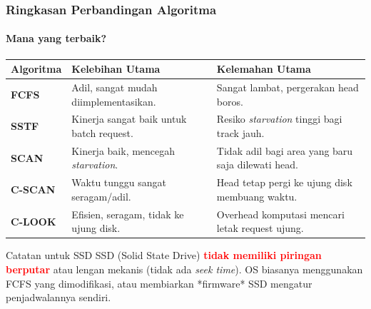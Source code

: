 \documentclass[t,aspectratio=169,xcolor=dvipsnames]{beamer}
\newcommand{\tem}[1]{\textbf{\textcolor{red}{#1}}}
\begin{document}
\begin{frame}
    \frametitle{Ringkasan Perbandingan Algoritma}
    \framesubtitle{Mana yang terbaik?}
    \small
    \begin{table}[]
        \centering
        \scriptsize
        \begin{tabular}{p{} p{} p{}}
            \toprule
            \textbf{Algoritma} & \textbf{Kelebihan Utama} & \textbf{Kelemahan Utama} \\
            \midrule
            \rowcolor{gray!10}
            \textbf{FCFS} & Adil, sangat mudah diimplementasikan. & Sangat lambat, pergerakan head boros. \\
            \textbf{SSTF} & Kinerja sangat baik untuk batch request. & Resiko \textit{starvation} tinggi bagi track jauh. \\
            \rowcolor{gray!10}
            \textbf{SCAN} & Kinerja baik, mencegah \textit{starvation}. & Tidak adil bagi area yang baru saja dilewati head. \\
            \textbf{C-SCAN} & Waktu tunggu sangat seragam/adil. & Head tetap pergi ke ujung disk membuang waktu. \\
            \rowcolor{gray!10}
            \textbf{C-LOOK} & Efisien, seragam, tidak ke ujung disk. & Overhead komputasi mencari letak request ujung. \\
            \bottomrule
        \end{tabular}
    \end{table}
    
    \vspace{0.2cm}
    \begin{exampleblock}{Catatan untuk SSD}
        SSD (Solid State Drive) \tem{tidak memiliki piringan berputar} atau lengan mekanis (tidak ada \textit{seek time}). OS biasanya menggunakan FCFS yang dimodifikasi, atau membiarkan *firmware* SSD mengatur penjadwalannya sendiri.
    \end{exampleblock}
\end{frame}
\end{document}
